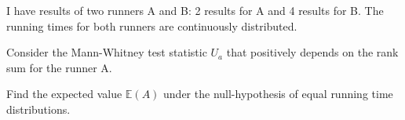 
\begin{question}
I have results of two runners A and B: 2 results for A and 4 results
for B. The running times for both runners are continuously distributed.

Consider the Mann-Whitney test statistic \(U_a\) that positively depends on the
rank sum for the runner A.

Find the expected value \(\mathbb{E}(A)\) under the null-hypothesis of equal running
time distributions.
\end{question}


